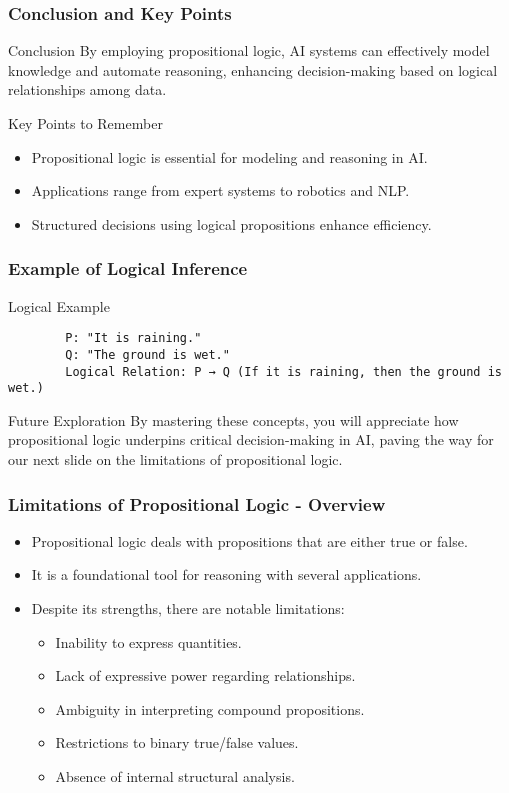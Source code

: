 \documentclass[aspectratio=169]{beamer}
\begin{document}
\begin{frame}[fragile]
    \frametitle{Conclusion and Key Points}
    \begin{block}{Conclusion}
        By employing propositional logic, AI systems can effectively model knowledge and automate reasoning, enhancing decision-making based on logical relationships among data.
    \end{block}
    \begin{block}{Key Points to Remember}
        \begin{itemize}
            \item Propositional logic is essential for modeling and reasoning in AI.
            \item Applications range from expert systems to robotics and NLP.
            \item Structured decisions using logical propositions enhance efficiency.
        \end{itemize}
    \end{block}
\end{frame}

\begin{frame}[fragile]
    \frametitle{Example of Logical Inference}
    \begin{block}{Logical Example}
        \begin{lstlisting}
        P: "It is raining."
        Q: "The ground is wet."
        Logical Relation: P → Q (If it is raining, then the ground is wet.)
        \end{lstlisting}
    \end{block}
    \begin{block}{Future Exploration}
        By mastering these concepts, you will appreciate how propositional logic underpins critical decision-making in AI, paving the way for our next slide on the limitations of propositional logic.
    \end{block}
\end{frame}

\begin{frame}[fragile]
    \frametitle{Limitations of Propositional Logic - Overview}
    \begin{itemize}
        \item Propositional logic deals with propositions that are either true or false.
        \item It is a foundational tool for reasoning with several applications.
        \item Despite its strengths, there are notable limitations:
        \begin{itemize}
            \item Inability to express quantities.
            \item Lack of expressive power regarding relationships.
            \item Ambiguity in interpreting compound propositions.
            \item Restrictions to binary true/false values.
            \item Absence of internal structural analysis.
        \end{itemize}
    \end{itemize}
\end{frame}
\end{document}
